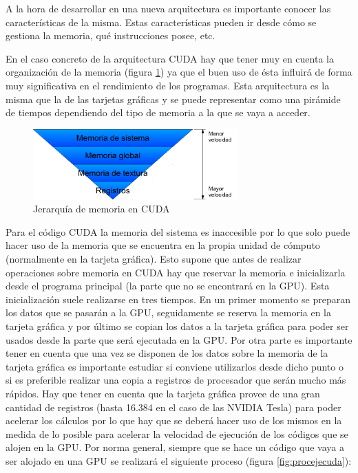 A la hora de desarrollar en una nueva arquitectura es importante conocer las características de la misma. Estas características pueden ir desde cómo se gestiona la memoria, qué instrucciones posee, etc.

En el caso concreto de la arquitectura CUDA hay que tener muy en cuenta la organización de la memoria (figura \ref{fig:memcuda}) ya que el buen uso de ésta influirá de forma muy significativa en el rendimiento de los programas. Esta arquitectura es la misma que la de las tarjetas gráficas y se puede representar como una pirámide de tiempos dependiendo del tipo de memoria a la que se vaya a acceder.

\begin{figure}
	\centering
	\includegraphics[width=0.7\textwidth]{images/MemoriaCuda.pdf}
	\caption{Jerarquía de memoria en CUDA}\label{fig:memcuda}
\end{figure}

Para el código CUDA la memoria del sistema es inaccesible por lo que solo puede hacer uso de la memoria que se encuentra en la propia unidad de cómputo (normalmente en la tarjeta gráfica). Esto supone que antes de realizar operaciones sobre memoria en CUDA hay que reservar la memoria e inicializarla desde el programa principal (la parte que no se encontrará en la GPU). Esta inicialización suele realizarse en tres tiempos. En un primer momento se preparan los datos que se pasarán a la GPU, seguidamente se reserva la memoria en la tarjeta gráfica y por último se copian los datos a la tarjeta gráfica para poder ser usados desde la parte que será ejecutada en la GPU.
Por otra parte es importante tener en cuenta que una vez se disponen de los datos sobre la memoria de la tarjeta gráfica es importante estudiar si conviene utilizarlos desde dicho punto o si es preferible realizar una copia a registros de procesador que serán mucho más rápidos. Hay que tener en cuenta que la tarjeta gráfica provee de una gran cantidad de registros (hasta 16.384 en el caso de las NVIDIA Tesla) para poder acelerar los cálculos por lo que hay que se deberá hacer uso de los mismos en la medida de lo posible para acelerar la velocidad de ejecución de los códigos que se alojen en la GPU.
Por norma general, siempre que se hace un código que vaya a ser alojado en una GPU se realizará el siguiente proceso (figura \ref{fig:procejecuda}):


